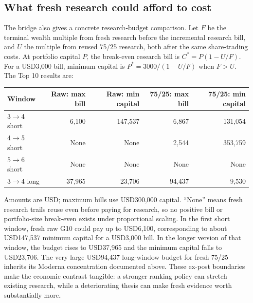 \subsection{What fresh research could afford to cost}

The bridge also gives a concrete research-budget comparison. Let $F$
be the terminal wealth multiple from fresh research before the incremental
research bill, and $U$ the multiple from reused 75/25 research, both after
the same share-trading costs. At portfolio capital $P$, the break-even
research bill is $C^*=P(1-U/F)$. For a USD3,000 bill, minimum capital is
$P^*=3000/(1-U/F)$ when $F>U$. The Top 10 results are:

\begin{minipage}{\linewidth}
\begin{center}\small\setlength{\tabcolsep}{4pt}\renewcommand{\arraystretch}{1.18}
\begin{longtable}{@{}lrrrr@{}}\toprule
Window & Raw: max bill & Raw: min capital & 75/25: max bill & 75/25: min capital\\\midrule\endhead
3$\to$4 short & 6,100 & 147,537 & 6,867 & 131,054\\
4$\to$5 short & None & None & 2,544 & 353,759\\
5$\to$6 short & None & None & None & None\\
3$\to$4 long & 37,965 & 23,706 & 94,437 & 9,530\\
\bottomrule\end{longtable}\end{center}
\end{minipage}\par

Amounts are USD; maximum bills use USD300,000 capital. ``None'' means
fresh research trails reuse even before paying for research, so no positive
bill or portfolio-size break-even exists under proportional scaling.
In the first short window, fresh raw G10 could pay up to USD6,100,
corresponding to about USD147,537 minimum capital for a USD3,000 bill.
In the longer version of that window, the budget rises to USD37,965 and
the minimum capital falls to USD23,706. The very large USD94,437 long-window
budget for fresh 75/25 inherits its Moderna concentration documented above.
These ex-post boundaries make the economic contrast tangible: a stronger
ranking policy can stretch existing research, while a deteriorating thesis
can make fresh evidence worth substantially more.

